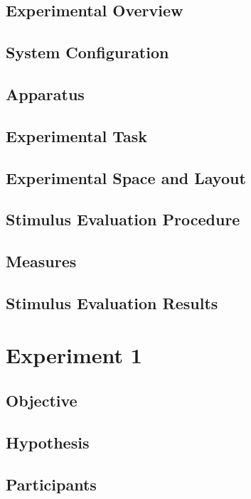 \section{Experimental Overview}

\section{System Configuration}

\section{Apparatus}

\section{Experimental Task}

\section{Experimental Space and Layout}

\section{Stimulus Evaluation Procedure}

\section{Measures}

\section{Stimulus Evaluation Results}

\clearpage

\chapter{Experiment 1}

\section{Objective}

\section{Hypothesis}

\section{Participants}

